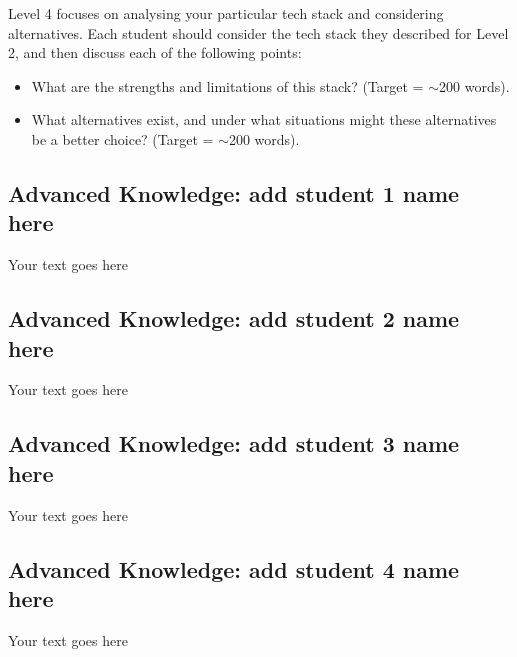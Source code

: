 \documentclass[a4paper, 11pt]{report}
\begin{document}
Level 4 focuses on analysing your particular tech stack and considering alternatives. Each student should consider the tech stack they described for Level 2, and then discuss each of the following points:
\begin{itemize}
    \item What are the strengths and limitations of this stack? (Target = $\sim$200 words).
    \item What alternatives exist, and under what situations might these alternatives be a better choice? (Target = $\sim$200 words).
\end{itemize}

\subsection{Advanced Knowledge: add student 1 name here}

Your text goes here

\subsection{Advanced Knowledge: add student 2 name here}

Your text goes here

\subsection{Advanced Knowledge: add student 3 name here}

Your text goes here

\subsection{Advanced Knowledge: add student 4 name here}

Your text goes here




\newpage



\end{document}
